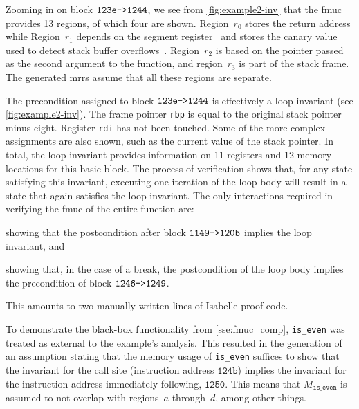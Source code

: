 Zooming in on block $\texttt{123e->1244}$, we see from \cref{fig:example2-inv}
that the \ac{fmuc} provides 13 regions, of which four are shown.
Region~$r_0$ stores the return address
while Region~$r_1$ depends on the segment register~
and stores the canary value
used to detect stack buffer overflows~\citep{cowan1998stackguard}.%
Region~$r_2$ is based on the pointer passed as the second argument to the function,
and region~$r_3$ is part of the stack frame.
The generated \acp{mrr} assume that all these regions are separate.

The precondition assigned to block $\texttt{123e->1244}$%
is effectively a loop invariant (see \cref{fig:example2-inv}).%
The frame pointer \lstinline|rbp|%
is equal to the original stack pointer minus eight.%
Register \lstinline|rdi| has not been touched.
Some of the more complex assignments are also shown,
such as the current value of the stack pointer.
In total, the loop invariant provides information
on 11 registers and 12 memory locations for this basic block.%
The process of verification shows that,
for any state satisfying this invariant,
executing one iteration of the loop body
will result in a state that again satisfies the loop invariant.
The only interactions required in verifying the \ac{fmuc} of the entire function are:
\begin{enumerate*}
  \item showing that the postcondition after block $\texttt{1149->120b}$%
  implies the loop invariant, and
  \item showing that, in the case of a break, the postcondition of the loop body%
  implies the precondition of block $\texttt{1246->1249}$.
\end{enumerate*}
This amounts to two manually written lines of Isabelle proof code.  

To demonstrate the black-box functionality from \cref{sse:fmuc_comp},%
\lstinline|is_even| was treated as external to the example's analysis.
This resulted in the generation of an assumption
stating that the memory usage of \lstinline|is_even| suffices to show that%
the invariant for the call site (instruction address $\mathtt{124b}$)%
implies the invariant for the instruction address immediately following,
$\mathtt{1250}$.
This means that $M_\mathtt{is\_even}$
is assumed to not overlap with regions~$a$ through~$d$, among other things.

